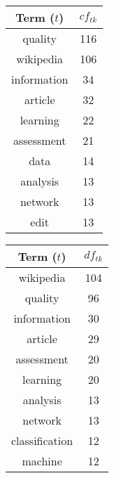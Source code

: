 \begin{table}[ht]
\begin{minipage}{.2\textwidth}
\begin{tabular}{c c}
            \toprule
            Term ($t$) & $cf_{tk}$ \\
            \midrule
            quality & 116 \\
            wikipedia & 106 \\
            information & 34 \\
            article & 32 \\
            learning & 22 \\
            assessment & 21 \\
            data & 14 \\
            analysis & 13 \\
            network & 13 \\
            edit & 13 \\
            \bottomrule
        \end{tabular}
    \end{minipage}
    \begin{minipage}{.2\textwidth}
        \centering
        \begin{tabular}{c c}
            \toprule
            Term ($t$) & $df_{tk}$ \\
            \midrule
            wikipedia & 104 \\
            quality & 96 \\
            information & 30 \\
            article & 29 \\
            assessment & 20 \\
            learning & 20 \\
            analysis & 13 \\
            network & 13 \\
            classification & 12 \\
            machine & 12 \\
            \bottomrule
        \end{tabular}
    \end{minipage}
\end{table}
